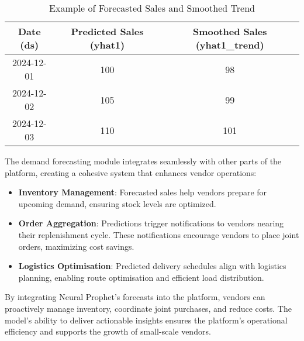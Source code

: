 \begin{table}[h!]
    \centering
    \begin{tabular}{|c|c|c|}
        \hline
        \textbf{Date (ds)} & \textbf{Predicted Sales (yhat1)} & \textbf{Smoothed Sales (yhat1\_trend)} \\
        \hline
        2024-12-01         & 100                              & 98                                     \\
        2024-12-02         & 105                              & 99                                     \\
        2024-12-03         & 110                              & 101                                    \\
        \hline
    \end{tabular}
    \caption{Example of Forecasted Sales and Smoothed Trend}
\end{table}



The demand forecasting module integrates seamlessly with other parts of the platform, creating a cohesive system that enhances vendor operations:

\begin{itemize}
    \item \textbf{Inventory Management}: Forecasted sales help vendors prepare for upcoming demand, ensuring stock levels are optimized.
    \item \textbf{Order Aggregation}: Predictions trigger notifications to vendors nearing their replenishment cycle. These notifications encourage vendors to place joint orders, maximizing cost savings.
    \item \textbf{Logistics Optimisation}: Predicted delivery schedules align with logistics planning, enabling route optimisation and efficient load distribution.
\end{itemize}
By integrating Neural Prophet’s forecasts into the platform, vendors can proactively manage inventory, coordinate joint purchases, and reduce costs. The model’s ability to deliver actionable insights ensures the platform’s operational efficiency and supports the growth of small-scale vendors.
